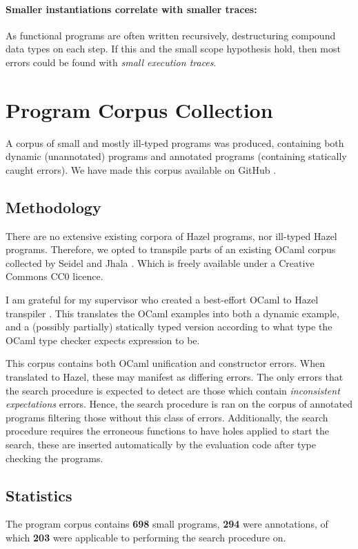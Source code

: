 \paragraph{Smaller instantiations correlate with smaller traces: } As functional programs are often written recursively, destructuring compound data types on each step. If this and the small scope hypothesis hold, then most errors could be found with \textit{small execution traces}.

\section{Program Corpus Collection}\label{sec:CorpusCollection}

A corpus of small and mostly ill-typed programs was produced, containing both dynamic (unannotated) programs and annotated programs (containing statically caught errors). We have made this corpus available on GitHub \cite{HazelCorpus}.

\subsection{Methodology}
There are no extensive existing corpora of Hazel programs, nor ill-typed Hazel programs. Therefore, we opted to transpile parts of an existing OCaml corpus collected by Seidel and Jhala \cite{OCamlCorpus}. Which is freely available under a Creative Commons CC0 licence. 

I am grateful for my supervisor who created a best-effort OCaml to Hazel transpiler \cite{HazelOfOCaml}. This translates the OCaml examples into both a dynamic example, and a (possibly partially) statically typed version according to what type the OCaml type checker expects expression to be.

This corpus contains both OCaml unification and constructor errors. When translated to Hazel, these may manifest as differing errors. The only errors that the search procedure is expected to detect are those which contain \textit{inconsistent expectations} errors. Hence, the search procedure is ran on the corpus of annotated programs filtering those without this class of errors. Additionally, the search procedure requires the erroneous functions to have holes applied to start the search, these are inserted automatically by the evaluation code after type checking the programs.


\subsection{Statistics}
The program corpus contains \textbf{698} small programs, \textbf{294} were annotations, of which \textbf{203} were applicable to performing the search procedure on.

